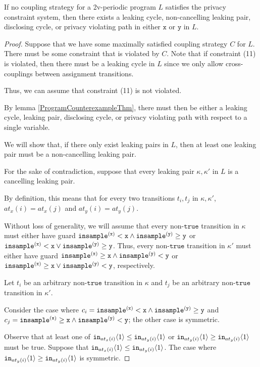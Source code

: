 \begin{lemma}\label{2vUnsatisfiableImpliesNotWellformedLemma}
    If no coupling strategy for a 2v-periodic program $L$ satisfies the privacy constraint system, then there exists a leaking cycle, non-cancelling leaking pair, disclosing cycle, or privacy violating path in either $\texttt{x}$ or $\texttt{y}$ in $L$.
\end{lemma}
\begin{proof}
    Suppose that we have some maximally satisfied coupling strategy $C$ for $L$. There must be some constraint that is violated by $C$. Note that if constraint (11) is violated, then there must be a leaking cycle in $L$ since we only allow cross-couplings between assignment transitions. 

    Thus, we can assume that constraint (11) is not violated. 

    By lemma \ref{ProgramCounterexampleThm}, there must then be either a leaking cycle, leaking pair, disclosing cycle, or privacy violating path with respect to a single variable. 

    We will show that, if there only exist leaking pairs in $L$, then at least one leaking pair must be a non-cancelling leaking pair. 

    For the sake of contradiction, suppose that every leaking pair $\kappa, \kappa'$ in $L$ is a cancelling leaking pair. 

    By definition, this means that for every two transitions $t_i, t_j$ in $\kappa, \kappa'$, $at_x(i) = at_x(j)$ and $at_y(i) = at_y(j)$.

    Without loss of generality, we will assume that every non-$\texttt{true}$ transition in $\kappa$ must either have guard $\mvlguard[\texttt{x}]\land\mvgguard[\texttt{y}]$ or $\mvlguard[\texttt{x}]\lor\mvgguard[\texttt{y}]$. Thus, every non-$\texttt{true}$ transition in $\kappa'$ must either have guard $\mvgguard[\texttt{x}]\land\mvlguard[\texttt{y}]$ or $\mvgguard[\texttt{x}]\lor\mvlguard[\texttt{y}]$, respectively. 

    Let $t_i$ be an arbitrary non-$\texttt{true}$ transition in $\kappa$ and $t_j$ be an arbitrary non-$\texttt{true}$ transition in $\kappa'$.

    Consider the case where $c_i = \mvlguard[\texttt{x}]\land\mvgguard[\texttt{y}]$ and $c_j = \mvgguard[\texttt{x}]\land\mvlguard[\texttt{y}]$; the other case is symmetric.

    Observe that at least one of $\texttt{in}_{at_x(i)}\brangle{1}\leq \texttt{in}_{at_y(i)}\brangle{1}$ or $\texttt{in}_{at_y(i)}\brangle{1}\geq \texttt{in}_{at_y(i)}\brangle{1}$ must be true. Suppose that $\texttt{in}_{at_x(i)}\brangle{1}\leq \texttt{in}_{at_y(i)}\brangle{1}$. The case where $\texttt{in}_{at_y(i)}\brangle{1}\geq \texttt{in}_{at_y(i)}\brangle{1}$ is symmetric. 


\end{proof}
